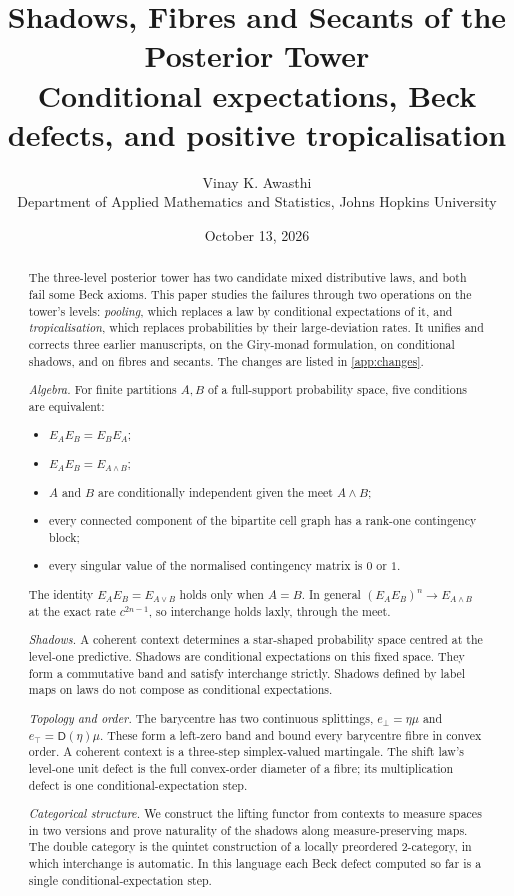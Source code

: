 \documentclass[11pt]{article}
\title{\textbf{Shadows, Fibres and Secants of the Posterior Tower}\\[.4em]
\large Conditional expectations, Beck defects, and positive tropicalisation}
\author{Vinay K. Awasthi\\ Department of Applied Mathematics and Statistics, Johns Hopkins University}
\date{October 13, 2026}
\theoremstyle{definition}
\newcommand{\D}{\mathsf D}
\newcommand{\ebot}{e_{\perp}}
\newcommand{\etop}{e_{\top}}
\begin{document}
\maketitle

\begin{abstract}
The three-level posterior tower \cite{Tower} has two candidate mixed distributive laws, and both fail some Beck axioms. This paper
studies the failures through two operations on the tower's levels: \emph{pooling}, which replaces a law by conditional expectations of
it, and \emph{tropicalisation}, which replaces probabilities by their large-deviation rates. It unifies and corrects three earlier
manuscripts, on the Giry-monad formulation, on conditional shadows, and on fibres and secants. The changes are listed in
\cref{app:changes}.

\emph{Algebra.} For finite partitions $A,B$ of a full-support probability space, five conditions are equivalent:
\begin{itemize}
\item $E_AE_B=E_BE_A$;
\item $E_AE_B=E_{A\wedge B}$;
\item $A$ and $B$ are conditionally independent given the meet $A\wedge B$;
\item every connected component of the bipartite cell graph has a rank-one contingency block;
\item every singular value of the normalised contingency matrix is $0$ or $1$.
\end{itemize}
The identity $E_AE_B=E_{A\vee B}$ holds only when $A=B$. In general $(E_AE_B)^n\to E_{A\wedge B}$ at the exact rate $c^{2n-1}$, so
interchange holds laxly, through the meet.

\emph{Shadows.} A coherent context determines a star-shaped probability space centred at the level-one predictive. Shadows are
conditional expectations on this fixed space. They form a commutative band and satisfy interchange strictly. Shadows defined by
label maps on laws do not compose as conditional expectations.

\emph{Topology and order.} The barycentre has two continuous splittings, $\ebot=\eta\mu$ and $\etop=\D(\eta)\mu$. These form a
left-zero band and bound every barycentre fibre in convex order. A coherent context is a three-step simplex-valued martingale. The
shift law's level-one unit defect is the full convex-order diameter of a fibre; its multiplication defect is one
conditional-expectation step.

\emph{Categorical structure.} We construct the lifting functor from contexts to measure spaces in two versions and prove naturality of
the shadows along measure-preserving maps. The double category is the quintet construction of a locally preordered 2-category, in
which interchange is automatic. In this language each Beck defect computed so far is a single conditional-expectation step.


\end{abstract}
\end{document}
